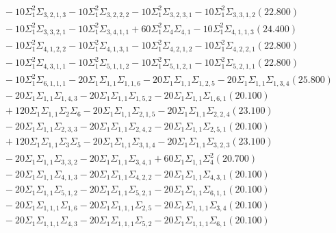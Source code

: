 \documentclass[12pt]{article}
\begin{document}
\begin{landscape}
\begin{align*}
		&\quad\quad -10\Sigma_{1}^{2}\Sigma_{3,2,1,3}-10\Sigma_{1}^{2}\Sigma_{3,2,2,2}-10\Sigma_{1}^{2}\Sigma_{3,2,3,1}-10\Sigma_{1}^{2}\Sigma_{3,3,1,2}(22.800) \\ 
		&\quad\quad -10\Sigma_{1}^{2}\Sigma_{3,3,2,1}-10\Sigma_{1}^{2}\Sigma_{3,4,1,1}+60\Sigma_{1}^{2}\Sigma_{4}\Sigma_{4,1}-10\Sigma_{1}^{2}\Sigma_{4,1,1,3}(24.400) \\ 
		&\quad\quad -10\Sigma_{1}^{2}\Sigma_{4,1,2,2}-10\Sigma_{1}^{2}\Sigma_{4,1,3,1}-10\Sigma_{1}^{2}\Sigma_{4,2,1,2}-10\Sigma_{1}^{2}\Sigma_{4,2,2,1}(22.800) \\ 
		&\quad\quad -10\Sigma_{1}^{2}\Sigma_{4,3,1,1}-10\Sigma_{1}^{2}\Sigma_{5,1,1,2}-10\Sigma_{1}^{2}\Sigma_{5,1,2,1}-10\Sigma_{1}^{2}\Sigma_{5,2,1,1}(22.800) \\ 
		&\quad\quad -10\Sigma_{1}^{2}\Sigma_{6,1,1,1}-20\Sigma_{1}\Sigma_{1,1}\Sigma_{1,1,6}-20\Sigma_{1}\Sigma_{1,1}\Sigma_{1,2,5}-20\Sigma_{1}\Sigma_{1,1}\Sigma_{1,3,4}(25.800) \\ 
		&\quad\quad -20\Sigma_{1}\Sigma_{1,1}\Sigma_{1,4,3}-20\Sigma_{1}\Sigma_{1,1}\Sigma_{1,5,2}-20\Sigma_{1}\Sigma_{1,1}\Sigma_{1,6,1}(20.100) \\ 
		&\quad\quad +120\Sigma_{1}\Sigma_{1,1}\Sigma_{2}\Sigma_{6}-20\Sigma_{1}\Sigma_{1,1}\Sigma_{2,1,5}-20\Sigma_{1}\Sigma_{1,1}\Sigma_{2,2,4}(23.100) \\ 
		&\quad\quad -20\Sigma_{1}\Sigma_{1,1}\Sigma_{2,3,3}-20\Sigma_{1}\Sigma_{1,1}\Sigma_{2,4,2}-20\Sigma_{1}\Sigma_{1,1}\Sigma_{2,5,1}(20.100) \\ 
		&\quad\quad +120\Sigma_{1}\Sigma_{1,1}\Sigma_{3}\Sigma_{5}-20\Sigma_{1}\Sigma_{1,1}\Sigma_{3,1,4}-20\Sigma_{1}\Sigma_{1,1}\Sigma_{3,2,3}(23.100) \\ 
		&\quad\quad -20\Sigma_{1}\Sigma_{1,1}\Sigma_{3,3,2}-20\Sigma_{1}\Sigma_{1,1}\Sigma_{3,4,1}+60\Sigma_{1}\Sigma_{1,1}\Sigma_{4}^{2}(20.700) \\ 
		&\quad\quad -20\Sigma_{1}\Sigma_{1,1}\Sigma_{4,1,3}-20\Sigma_{1}\Sigma_{1,1}\Sigma_{4,2,2}-20\Sigma_{1}\Sigma_{1,1}\Sigma_{4,3,1}(20.100) \\ 
		&\quad\quad -20\Sigma_{1}\Sigma_{1,1}\Sigma_{5,1,2}-20\Sigma_{1}\Sigma_{1,1}\Sigma_{5,2,1}-20\Sigma_{1}\Sigma_{1,1}\Sigma_{6,1,1}(20.100) \\ 
		&\quad\quad -20\Sigma_{1}\Sigma_{1,1,1}\Sigma_{1,6}-20\Sigma_{1}\Sigma_{1,1,1}\Sigma_{2,5}-20\Sigma_{1}\Sigma_{1,1,1}\Sigma_{3,4}(20.100) \\ 
		&\quad\quad -20\Sigma_{1}\Sigma_{1,1,1}\Sigma_{4,3}-20\Sigma_{1}\Sigma_{1,1,1}\Sigma_{5,2}-20\Sigma_{1}\Sigma_{1,1,1}\Sigma_{6,1}(20.100) \\ 

\end{align*}
\end{landscape}
\end{document}
